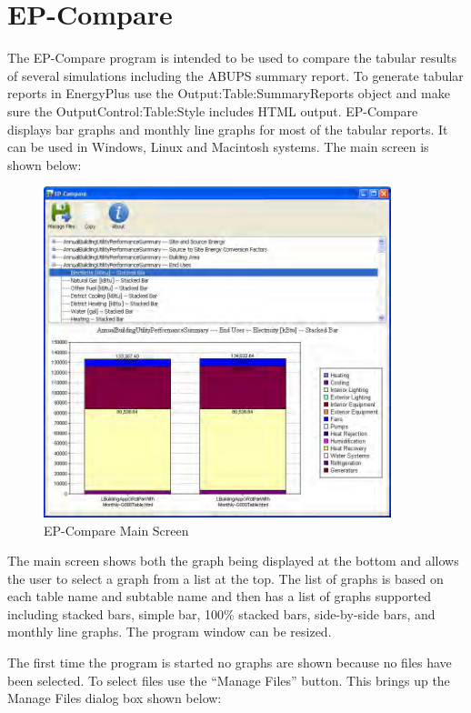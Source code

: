 \section{EP-Compare}\label{ep-compare}

The EP-Compare program is intended to be used to compare the tabular results of several simulations including the ABUPS summary report. To generate tabular reports in EnergyPlus use the Output:Table:SummaryReports object and make sure the OutputControl:Table:Style includes HTML output. EP-Compare displays bar graphs and monthly line graphs for most of the tabular reports. It can be used in Windows, Linux and Macintosh systems. The main screen is shown below:

\begin{figure}[hbtp] %
\centering
\includegraphics[width=0.9\textwidth, height=0.9\textheight, keepaspectratio=true]{media/image122.png}
\caption{EP-Compare Main Screen \protect \label{fig:ep-compare-main-screen}}
\end{figure}

The main screen shows both the graph being displayed at the bottom and allows the user to select a graph from a list at the top. The list of graphs is based on each table name and subtable name and then has a list of graphs supported including stacked bars, simple bar, 100\% stacked bars, side-by-side bars, and monthly line graphs. The program window can be resized.

The first time the program is started no graphs are shown because no files have been selected. To select files use the ``Manage Files'' button. This brings up the Manage Files dialog box shown below:

